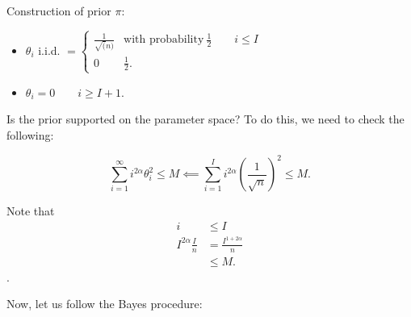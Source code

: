 \documentclass[twoside]{article}
\theoremstyle{definition}
\theoremstyle{definition}
\theoremstyle{remark}
\begin{document}
Construction of prior $\pi$:
\begin{itemize}
\item $\theta_i$ i.i.d. $= \begin{cases}
\frac{1}{\sqrt(n)} & \text{with probability} \ \frac{1}{2} \quad \quad i \leq I \\
0 & \frac{1}{2}.
\end{cases}$
\item $\theta_i = 0 \quad \quad i \geq I+1$.
\end{itemize}

Is the prior supported on the parameter space? To do this, we need to check the following:

\[
\sum \limits_{i=1}^\infty i^{2\alpha} \theta_i^2 \leq M \impliedby \sum \limits_{i=1}^I i^{2\alpha} ( \frac{1}{\sqrt{n}})^2 \leq M.
\]

Note that 
\[
\begin{aligned}
i &\leq I \\
I^{2\alpha} \frac{I}{n} &= \frac{I^{1+2\alpha}}{n} \\
&\leq M.
\end{aligned}
\].

Now, let us follow the Bayes procedure:
\end{document}
